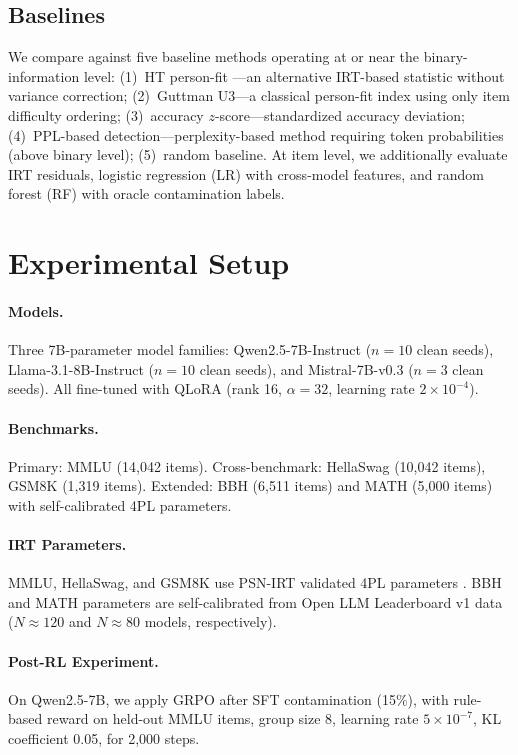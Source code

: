 \documentclass[11pt,a4paper]{article}
\begin{document}
\subsection{Baselines}

We compare against five baseline methods operating at or near the binary-information level:
(1)~HT person-fit \citep{htpersonfit}---an alternative IRT-based statistic without variance correction;
(2)~Guttman U3---a classical person-fit index using only item difficulty ordering;
(3)~accuracy $z$-score---standardized accuracy deviation;
(4)~PPL-based detection---perplexity-based method requiring token probabilities (above binary level);
(5)~random baseline.
At item level, we additionally evaluate IRT residuals, logistic regression (LR) with cross-model features, and random forest (RF) with oracle contamination labels.

\section{Experimental Setup}
\label{sec:setup}

\paragraph{Models.}
Three 7B-parameter model families: Qwen2.5-7B-Instruct ($n=10$ clean seeds), Llama-3.1-8B-Instruct ($n=10$ clean seeds), and Mistral-7B-v0.3 ($n=3$ clean seeds).
All fine-tuned with QLoRA (rank 16, $\alpha=32$, learning rate $2\times10^{-4}$).

\paragraph{Benchmarks.}
Primary: MMLU (14,042 items).
Cross-benchmark: HellaSwag (10,042 items), GSM8K (1,319 items).
Extended: BBH (6,511 items) and MATH (5,000 items) with self-calibrated 4PL parameters.

\paragraph{IRT Parameters.}
MMLU, HellaSwag, and GSM8K use PSN-IRT validated 4PL parameters \citep{psnirt2026}.
BBH and MATH parameters are self-calibrated from Open LLM Leaderboard v1 data ($N\approx120$ and $N\approx80$ models, respectively).

\paragraph{Post-RL Experiment.}
On Qwen2.5-7B, we apply GRPO \citep{grpo2024} after SFT contamination (15\%), with rule-based reward on held-out MMLU items, group size 8, learning rate $5\times10^{-7}$, KL coefficient 0.05, for 2,000 steps.
\end{document}
